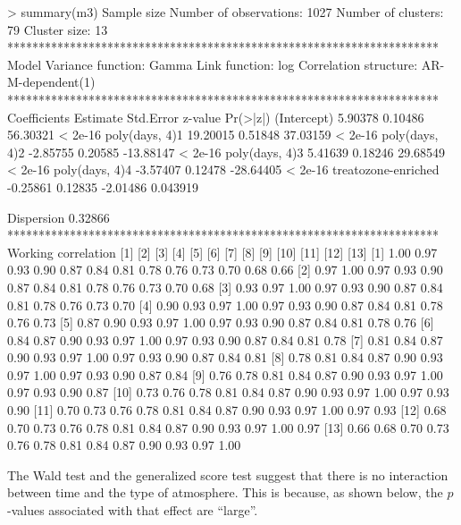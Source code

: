 \begin{example}
> summary(m3)
Sample size
   Number of observations:  1027
       Number of clusters:  79 
             Cluster size:  13 
*********************************************************************
Model
        Variance function:  Gamma
            Link function:  log
    Correlation structure:  AR-M-dependent(1)
*********************************************************************
Coefficients
                     Estimate Std.Error   z-value Pr(>|z|)
(Intercept)           5.90378   0.10486  56.30321  < 2e-16
poly(days, 4)1       19.20015   0.51848  37.03159  < 2e-16
poly(days, 4)2       -2.85755   0.20585 -13.88147  < 2e-16
poly(days, 4)3        5.41639   0.18246  29.68549  < 2e-16
poly(days, 4)4       -3.57407   0.12478 -28.64405  < 2e-16
treatozone-enriched  -0.25861   0.12835  -2.01486 0.043919
                                                          
Dispersion            0.32866                             
*********************************************************************
Working correlation
     [1]  [2]  [3]  [4]  [5]  [6]  [7]  [8]  [9]  [10] [11] [12] [13] 
[1]  1.00 0.97 0.93 0.90 0.87 0.84 0.81 0.78 0.76 0.73 0.70 0.68 0.66
[2]  0.97 1.00 0.97 0.93 0.90 0.87 0.84 0.81 0.78 0.76 0.73 0.70 0.68
[3]  0.93 0.97 1.00 0.97 0.93 0.90 0.87 0.84 0.81 0.78 0.76 0.73 0.70
[4]  0.90 0.93 0.97 1.00 0.97 0.93 0.90 0.87 0.84 0.81 0.78 0.76 0.73
[5]  0.87 0.90 0.93 0.97 1.00 0.97 0.93 0.90 0.87 0.84 0.81 0.78 0.76
[6]  0.84 0.87 0.90 0.93 0.97 1.00 0.97 0.93 0.90 0.87 0.84 0.81 0.78
[7]  0.81 0.84 0.87 0.90 0.93 0.97 1.00 0.97 0.93 0.90 0.87 0.84 0.81
[8]  0.78 0.81 0.84 0.87 0.90 0.93 0.97 1.00 0.97 0.93 0.90 0.87 0.84
[9]  0.76 0.78 0.81 0.84 0.87 0.90 0.93 0.97 1.00 0.97 0.93 0.90 0.87
[10] 0.73 0.76 0.78 0.81 0.84 0.87 0.90 0.93 0.97 1.00 0.97 0.93 0.90
[11] 0.70 0.73 0.76 0.78 0.81 0.84 0.87 0.90 0.93 0.97 1.00 0.97 0.93
[12] 0.68 0.70 0.73 0.76 0.78 0.81 0.84 0.87 0.90 0.93 0.97 1.00 0.97
[13] 0.66 0.68 0.70 0.73 0.76 0.78 0.81 0.84 0.87 0.90 0.93 0.97 1.00
\end{example}

The Wald test and the generalized score test suggest that there is no interaction between time and the type of atmosphere. This is because, as shown below, the $p$-values associated with that effect are ``large''. 

